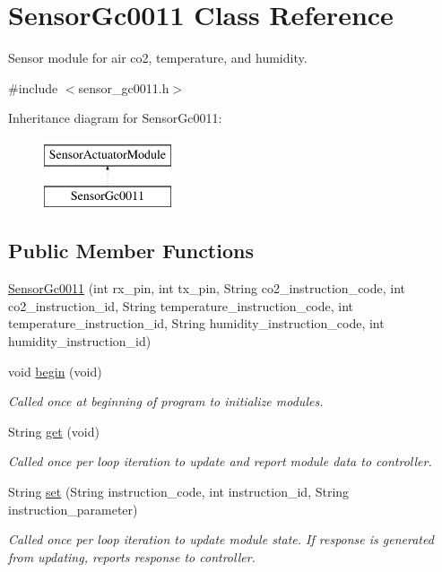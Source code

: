 \hypertarget{class_sensor_gc0011}{}\section{Sensor\+Gc0011 Class Reference}
\label{class_sensor_gc0011}


Sensor module for air co2, temperature, and humidity.  




{\ttfamily \#include $<$sensor\+\_\+gc0011.\+h$>$}

Inheritance diagram for Sensor\+Gc0011\+:\begin{figure}[H]
\begin{center}
\leavevmode
\includegraphics[height=2.000000cm]{class_sensor_gc0011}
\end{center}
\end{figure}
\subsection*{Public Member Functions}
\begin{DoxyCompactItemize}
\item 
\hyperlink{class_sensor_gc0011_ac8b12368b4b524198210048fbd1d0c81}{Sensor\+Gc0011} (int rx\+\_\+pin, int tx\+\_\+pin, String co2\+\_\+instruction\+\_\+code, int co2\+\_\+instruction\+\_\+id, String temperature\+\_\+instruction\+\_\+code, int temperature\+\_\+instruction\+\_\+id, String humidity\+\_\+instruction\+\_\+code, int humidity\+\_\+instruction\+\_\+id)
\item 
void \hyperlink{class_sensor_gc0011_a661743d47448c6b9c965fd8e1f123fbc}{begin} (void)
\begin{DoxyCompactList}\small\item\em Called once at beginning of program to initialize modules. \end{DoxyCompactList}\item 
String \hyperlink{class_sensor_gc0011_a2920401f54e121bba1398d52e9b2c90a}{get} (void)
\begin{DoxyCompactList}\small\item\em Called once per loop iteration to update and report module data to controller. \end{DoxyCompactList}\item 
String \hyperlink{class_sensor_gc0011_a658b7856221577342b54e4dc7fe06d2a}{set} (String instruction\+\_\+code, int instruction\+\_\+id, String instruction\+\_\+parameter)
\begin{DoxyCompactList}\small\item\em Called once per loop iteration to update module state. If response is generated from updating, reports response to controller. \end{DoxyCompactList}\end{DoxyCompactItemize}
